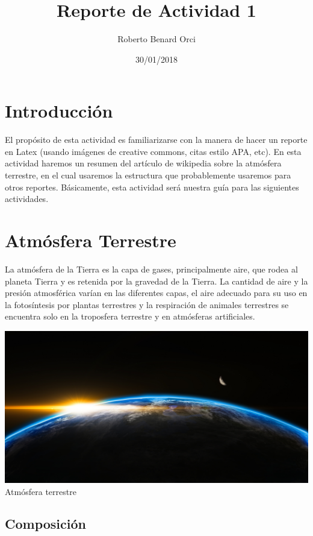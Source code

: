 \documentclass{article}
\title{Reporte de Actividad 1}
\author{Roberto Benard Orci}
\date{30/01/2018}
\begin{document}
\maketitle

\section{Introducción}

El propósito de esta actividad es familiarizarse con la manera de hacer un reporte en Latex (usando imágenes de creative commons, citas estilo APA, etc). En esta actividad haremos un resumen del artículo de wikipedia sobre la atmósfera terrestre, en el cual usaremos la estructura que probablemente usaremos para otros reportes. Básicamente, esta actividad será nuestra guía para las siguientes actividades.

\section{Atmósfera Terrestre}

La atmósfera de la Tierra es la capa de gases, principalmente aire, que rodea al planeta Tierra y es retenida por la gravedad de la Tierra. La cantidad de aire y la presión atmosférica varían en las diferentes capas, el aire adecuado para su uso en la fotosíntesis por plantas terrestres y la respiración de animales terrestres se encuentra solo en la troposfera terrestre y en atmósferas artificiales.

\vspace{0.5cm}

\begin{center}
	\includegraphics[width=\linewidth]{Atmosphere.jpeg}
    Atmósfera terrestre
\end{center}

\subsection{Composición}
\end{document}
